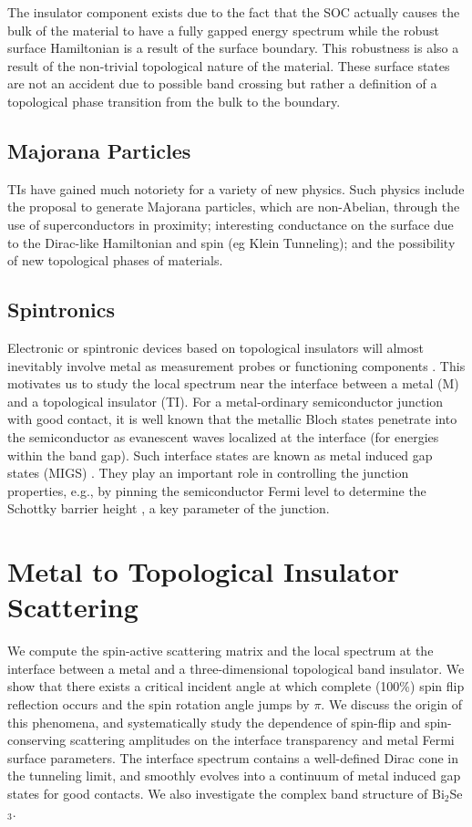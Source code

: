 \documentclass[11pt]{report}
\begin{document}
The insulator component exists due to the fact that the SOC actually causes the bulk of the material to have a fully gapped energy spectrum while the robust surface Hamiltonian is a result of the surface boundary. This robustness is also a result of the non-trivial topological nature of the material. These surface states are not an accident due to possible band crossing but rather a definition of a topological phase transition from the bulk to the boundary.

\section{Majorana Particles}
TIs have gained much notoriety for a variety of new physics. Such physics include the proposal to generate Majorana particles, which are non-Abelian, through the use of superconductors in proximity; interesting conductance on the surface due to the Dirac-like Hamiltonian and spin (eg Klein Tunneling); and the possibility of new topological phases of materials.



\section{Spintronics}
Electronic or spintronic devices based on topological insulators will almost inevitably involve metal as measurement probes or functioning components \cite{yokoyama09}. This motivates us to study the local spectrum near the interface between a metal (M) and a topological insulator (TI). For a metal-ordinary semiconductor junction with good contact, it is well known that the metallic Bloch states penetrate into the semiconductor as evanescent waves localized at the interface (for energies within the band gap). Such interface states are known as metal induced gap states (MIGS) \cite{heine65,cohen}. They play an important role in controlling the junction properties, e.g., by pinning the semiconductor Fermi level to determine the Schottky barrier height \cite{tersoff}, a key parameter of the junction.



\chapter{Metal to Topological Insulator Scattering}


We compute the spin-active scattering matrix and the local spectrum at the interface between a metal and a three-dimensional  topological band insulator. We show that there exists a critical incident angle at which complete (100\%) spin flip reflection occurs and the spin rotation angle jumps by $\pi$. We discuss the origin of this phenomena, and systematically study
the dependence of spin-flip and spin-conserving scattering amplitudes on
the interface transparency and metal Fermi surface parameters.
The interface spectrum contains a well-defined Dirac cone in the tunneling limit, and smoothly evolves into a continuum of metal induced gap states for good contacts. We also investigate the complex band structure of Bi$_2$Se$_3$.
\end{document}
